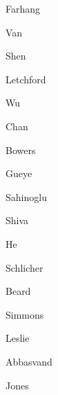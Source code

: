 Farhang~\cite{farhang2014dynamic}

Van~\cite{van2013flipit}

Shen~\cite{shen2011survey}

Letchford~\cite{letchford2011computing}

Wu~\cite{wu2010modeling}

Chan~\cite{chan2012interdependent}

Bowers~\cite{bowers2012defending}

Gueye~\cite{gueye2012towards}

Sahinoglu~\cite{sahinoglu2012game}

Shiva~\cite{shiva2012holistic}

He~\cite{he2012game}

Schlicher~\cite{schlicher2012information}

Beard~\cite{beard2012using}

Simmons~\cite{simmons2013adapt}

Leslie~\cite{leslie2015threshold}

Abbasvand~\cite{abbasvand2013survey}

Jones~\cite{jones2013asymmetric}
